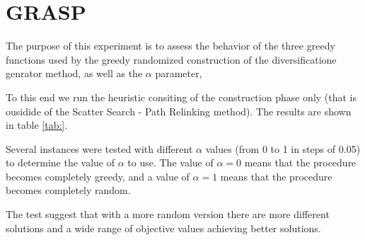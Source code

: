 \section{GRASP}
The purpose of this experiment
is to assess the behavior of the three greedy functions
used by the greedy randomized construction
of the diversificatione genrator method,
as well as the $\alpha$ parameter,

To this end
we run the heuristic consiting of
the construction phase only
(that is ousidide of the Scatter Search -
Path Relinking method).
The results are shown in table \ref{tab:}.

Several instances were tested
with different $\alpha$ values
(from 0 to 1 in steps of 0.05)
to determine the value of $\alpha$ to use.
The value of $\alpha = 0$ means that
the procedure becomes completely greedy,
and a value of $\alpha = 1$ means that
the procedure becomes completely random.

The test suggest
that
with a more random version
there are more different solutions
and a wide range of objective values
achieving better solutions.
